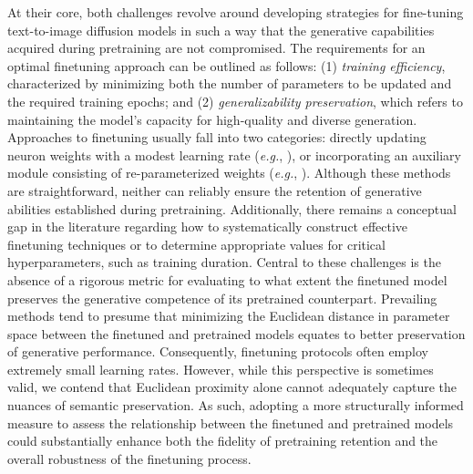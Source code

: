 At their core, both challenges revolve around developing strategies for fine-tuning text-to-image diffusion models in such a way that the generative capabilities acquired during pretraining are not compromised. The requirements for an optimal finetuning approach can be outlined as follows: (1) \emph{training efficiency}, characterized by minimizing both the number of parameters to be updated and the required training epochs; and (2) \emph{generalizability preservation}, which refers to maintaining the model’s capacity for high-quality and diverse generation. Approaches to finetuning usually fall into two categories: directly updating neuron weights with a modest learning rate (\emph{e.g.}, \cite{ruiz2023dreambooth}), or incorporating an auxiliary module consisting of re-parameterized weights (\emph{e.g.}, \cite{hulora2022,zhang2023adding}). Although these methods are straightforward, neither can reliably ensure the retention of generative abilities established during pretraining. Additionally, there remains a conceptual gap in the literature regarding how to systematically construct effective finetuning techniques or to determine appropriate values for critical hyperparameters, such as training duration. Central to these challenges is the absence of a rigorous metric for evaluating to what extent the finetuned model preserves the generative competence of its pretrained counterpart. Prevailing methods tend to presume that minimizing the Euclidean distance in parameter space between the finetuned and pretrained models equates to better preservation of generative performance. Consequently, finetuning protocols often employ extremely small learning rates. However, while this perspective is sometimes valid, we contend that Euclidean proximity alone cannot adequately capture the nuances of semantic preservation. As such, adopting a more structurally informed measure to assess the relationship between the finetuned and pretrained models could substantially enhance both the fidelity of pretraining retention and the overall robustness of the finetuning process.

